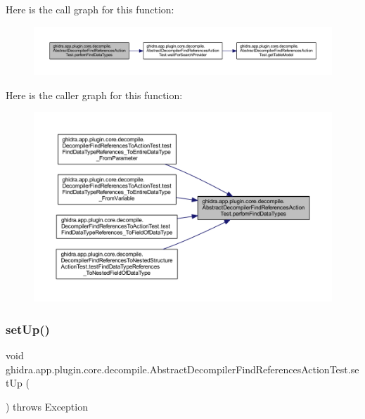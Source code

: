 Here is the call graph for this function\+:
\nopagebreak
\begin{figure}[H]
\begin{center}
\leavevmode
\includegraphics[width=350pt]{classghidra_1_1app_1_1plugin_1_1core_1_1decompile_1_1_abstract_decompiler_find_references_action_test_ac6f76cbf407c1f824b8859cd8fdb6889_cgraph}
\end{center}
\end{figure}
Here is the caller graph for this function\+:
\nopagebreak
\begin{figure}[H]
\begin{center}
\leavevmode
\includegraphics[width=350pt]{classghidra_1_1app_1_1plugin_1_1core_1_1decompile_1_1_abstract_decompiler_find_references_action_test_ac6f76cbf407c1f824b8859cd8fdb6889_icgraph}
\end{center}
\end{figure}
\mbox{\label{classghidra_1_1app_1_1plugin_1_1core_1_1decompile_1_1_abstract_decompiler_find_references_action_test_a1d1d74a3f84043df9d9c4053dad5688d}} 
\subsubsection{\texorpdfstring{setUp()}{setUp()}}
{\footnotesize\ttfamily void ghidra.\+app.\+plugin.\+core.\+decompile.\+Abstract\+Decompiler\+Find\+References\+Action\+Test.\+set\+Up (\begin{DoxyParamCaption}{ }\end{DoxyParamCaption}) throws Exception\hspace{0.3cm}{\ttfamily [inline]}}



